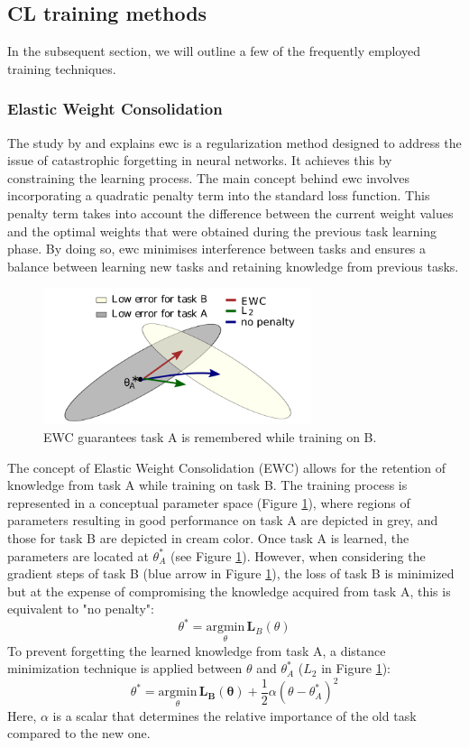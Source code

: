 \subsection{CL training methods}
In the subsequent section, we will outline a few of the frequently employed training techniques.
\subsubsection{Elastic Weight Consolidation}
\label{sec:ewc}
The study by \citep{kirkpatrick2017overcoming} and \citep{de2021continual} explains \acrshort{ewc} is a regularization method designed to address the issue of catastrophic forgetting in neural networks. It achieves this by constraining the learning process. The main concept behind \acrshort{ewc} involves incorporating a quadratic penalty term into the standard loss function. This penalty term takes into account the difference between the current weight values and the optimal weights that were obtained during the previous task learning phase. By doing so, \acrshort{ewc} minimises interference between tasks and ensures a balance between learning new tasks and retaining knowledge from previous tasks.
\begin{figure}[h]
\centering
    \includegraphics[width=0.7\textwidth]{Images//ewc.png}
    \caption{EWC guarantees task A is remembered while training on B. \citep{kirkpatrick2017overcoming}}
    \label{fig:ewc}
\end{figure}
The concept of Elastic Weight Consolidation (EWC) allows for the retention of knowledge from task A while training on task B. The training process is represented in a conceptual parameter space (Figure \ref{fig:ewc}), where regions of parameters resulting in good performance on task A are depicted in grey, and those for task B are depicted in cream color. Once task A is learned, the parameters are located at $\theta_{A}^{*}$ (see Figure \ref{fig:ewc}). However, when considering the gradient steps of task B (blue arrow in Figure \ref{fig:ewc}), the loss of task B is minimized but at the expense of compromising the knowledge acquired from task A, this is equivalent to "no penalty": \[ \theta^* = \underset{\theta}{\mathrm{argmin}} \, \mathbf{L}_B(\theta) \] To prevent forgetting the learned knowledge from task A, a distance minimization technique is applied between $\theta$ and $\theta^{*}_{A}$ ($L_{2}$ in Figure \ref{fig:ewc}): \[ \theta^{*} = \underset{\theta}{\mathrm{argmin}} \, \mathbf{L_B(\theta)} + \frac{1}{2} \alpha ( \theta - \theta_{A}^{*} )^{2} \] Here, $\alpha$ is a scalar that determines the relative importance of the old task compared to the new one. 
